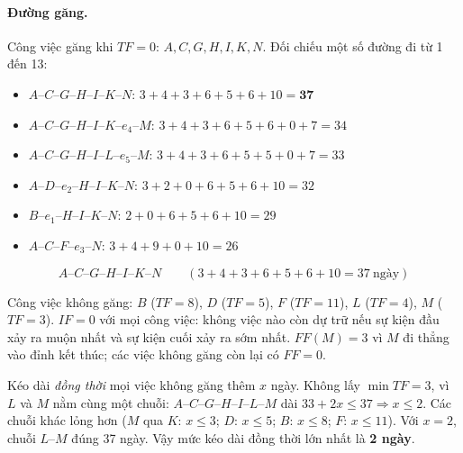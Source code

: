 \documentclass[12pt,a4paper]{article}
\begin{document}
\paragraph{Đường găng.}
Công việc găng khi $TF=0$: $A,C,G,H,I,K,N$.
Đối chiếu một số đường đi từ 1 đến 13:
\begin{itemize}[leftmargin=1.6em,itemsep=1pt]
  \item $A$--$C$--$G$--$H$--$I$--$K$--$N$: $3+4+3+6+5+6+10=\mathbf{37}$
  \item $A$--$C$--$G$--$H$--$I$--$K$--$e_4$--$M$: $3+4+3+6+5+6+0+7=34$
  \item $A$--$C$--$G$--$H$--$I$--$L$--$e_5$--$M$: $3+4+3+6+5+5+0+7=33$
  \item $A$--$D$--$e_2$--$H$--$I$--$K$--$N$: $3+2+0+6+5+6+10=32$
  \item $B$--$e_1$--$H$--$I$--$K$--$N$: $2+0+6+5+6+10=29$
  \item $A$--$C$--$F$--$e_3$--$N$: $3+4+9+0+10=26$
\end{itemize}
\[
  \boxed{A\text{--}C\text{--}G\text{--}H\text{--}I\text{--}K\text{--}N\qquad (3+4+3+6+5+6+10=37\ \text{ngày})}
\]

Công việc không găng: $B$ ($TF=8$), $D$ ($TF=5$), $F$ ($TF=11$), $L$ ($TF=4$), $M$ ($TF=3$).
$IF=0$ với mọi công việc: không việc nào còn dự trữ nếu sự kiện đầu xảy ra muộn nhất và sự kiện cuối xảy ra sớm nhất.
$FF(M)=3$ vì $M$ đi thẳng vào đỉnh kết thúc; các việc không găng còn lại có $FF=0$.

Kéo dài \emph{đồng thời} mọi việc không găng thêm $x$ ngày.
Không lấy $\min TF=3$, vì $L$ và $M$ nằm cùng một chuỗi:
$A$--$C$--$G$--$H$--$I$--$L$--$M$ dài $33+2x\le 37\Rightarrow x\le 2$.
Các chuỗi khác lỏng hơn ($M$ qua $K$: $x\le 3$; $D$: $x\le 5$; $B$: $x\le 8$; $F$: $x\le 11$).
Với $x=2$, chuỗi $L$--$M$ đúng 37 ngày. Vậy mức kéo dài đồng thời lớn nhất là \textbf{2 ngày}.
\end{document}
